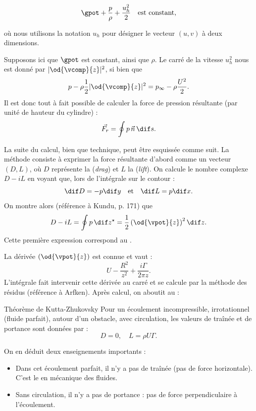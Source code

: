 \begin{displaymath}
\gpot + \frac{p}{\rho} + \frac{u_h^2}{2} \quad \text{est constant,}
\end{displaymath}

où nous utilisons la notation $u_h$ pour désigner le vecteur $(u,v)$ à deux dimensions.

Supposons ici que $\gpot$ est constant, ainsi que $\rho$. Le carré de la vitesse $u_h^2$ nous est donné par $|\od{\vcomp}{z}|^2$, si bien que
\[
p - \rho \frac{1}{2}|\od{\vcomp}{z}|^2 = p_\infty - \rho \frac{U^2}{2}.
\]
Il est donc tout à fait possible de calculer la force de pression résultante (par unité de hauteur du cylindre) :
\[
\vec{F_r} = \oint p\, \vec{n} \, \dif s.
\]

La suite du calcul, bien que technique, peut être esquissée comme suit. La méthode consiste à exprimer la force résultante d'abord comme un vecteur $(D,L)$, où $D$ représente la  (\emph{drag}) et $L$ la  (\emph{lift}). On calcule le nombre complexe $D - iL$ en voyant que, lors de l'intégrale sur le contour :
\[
\dif D = -p \dif y \quad \text{et} \quad \dif L = p \dif x.
\]
On montre alors (référence à Kundu, p. 171) que
\[
D - iL = \oint p \, \dif z^\star = \frac{1}{2} \left(\od{\vpot}{z}\right)^2 \dif z.
\]
Cette première expression correspond au .

La dérivée $\left(\od{\vpot}{z}\right)$ est connue et vaut :
\[
U - \frac{R^2}{z^2} + \frac{i\Gamma}{2\pi z}.
\]
L'intégrale fait intervenir cette dérivée au carré et se calcule par la méthode des résidus (référence à Arfken). Après calcul, on aboutit au  :

\begin{key}{Théorème de Kutta-Zhukovsky}
Pour un écoulement incompressible, irrotationnel (fluide parfait), autour d'un obstacle, avec circulation, les valeurs de traînée et de portance sont données par :
\[
D = 0, \quad L = \rho U \Gamma.
\]
\end{key}

On en déduit deux enseignements importants :
\begin{itemize}
    \item Dans cet écoulement parfait, il n'y a pas de traînée (pas de force horizontale). C'est le  en mécanique des fluides.
    \item Sans circulation, il n'y a pas de portance : pas de force perpendiculaire à l'écoulement.
\end{itemize}


